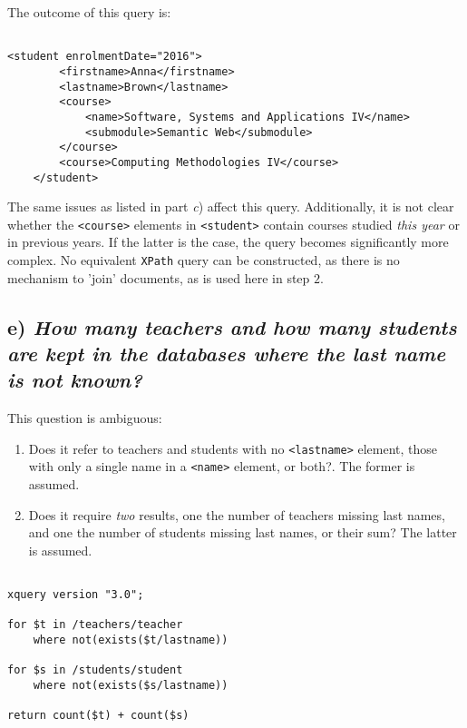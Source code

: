 \documentclass[11pt]{article} %
\begin{document}
The outcome of this query is:

\begin{verbatim}

<student enrolmentDate="2016">
        <firstname>Anna</firstname>
        <lastname>Brown</lastname>
        <course>
            <name>Software, Systems and Applications IV</name>
            <submodule>Semantic Web</submodule>
        </course>
        <course>Computing Methodologies IV</course>
    </student>

\end{verbatim}

The same issues as listed in part \textit{c}) affect this query. Additionally, it is not clear whether the \verb|<course>| elements in \verb|<student>| contain courses studied \textit{this year} or in previous years. If the latter is the case, the query becomes significantly more complex. No equivalent \verb|XPath| query can be constructed, as there is no mechanism to 'join' documents, as is used here in step $2$.

\subsection*{e) \textit{How many teachers and how many students are kept in the databases where the last name is not known?}}

This question is ambiguous:

\begin{enumerate}

\item{Does it refer to teachers and students with no \verb|<lastname>| element, those with only a single name in a \verb|<name>| element, or both?}. The former is assumed.
\item{Does it require \textit{two} results, one the number of teachers missing last names, and one the number of students missing last names, or their sum? The latter is assumed.}

\end{enumerate}

\begin{verbatim}

xquery version "3.0";

for $t in /teachers/teacher
	where not(exists($t/lastname))
    
for $s in /students/student
    where not(exists($s/lastname))

return count($t) + count($s)

\end{verbatim}
\end{document}
